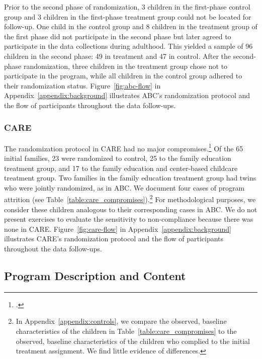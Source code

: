 \noindent Prior to the second phase of randomization, 3 children in the first-phase control group and 3 children in the first-phase treatment group could not be located for follow-up. One child in the control group and 8 children in the treatment group of the first phase did not participate in the second phase but later agreed to participate in the data collections during adulthood. This yielded a sample of 96 children in the second phase: 49 in treatment and 47 in control. After the second-phase randomization, three children in the treatment group chose not to participate in the program, while all children in the control group adhered to their randomization status. Figure~\ref{fig:abc-flow} in Appendix~\ref{appendix:background} illustrates ABC's randomization protocol and the flow of participants throughout the data follow-ups.\\

\subsubsection{CARE}

\noindent The randomization protocol in CARE had no major compromises.\footnote{\citet{Wasik_Ramey_etal_1990_CD,Burchinal_Campbell_etal_1997_CD}.} Of the 65 initial families, 23 were randomized to control, 25 to the family education treatment group, and 17 to the family education and center-based childcare treatment group. Two families in the family education treatment group had twins who were jointly randomized, as in ABC. We document four cases of program attrition (see Table~\ref{table:care_compromises}).\footnote{In Appendix~\ref{appendix:controls}, we compare the observed, baseline characteristics of the children in Table~\ref{table:care_compromises} to the observed, baseline characteristics of the children who complied to the initial treatment assignment. We find little evidence of differences.} For methodological purposes, we consider these children analogous to their corresponding cases in ABC. We do not present exercises to evaluate the sensitivity to non-compliance because there was none in CARE. Figure~\ref{fig:care-flow} in Appendix~\ref{appendix:background} illustrates CARE's randomization protocol and the flow of participants throughout the data follow-ups.\\



\subsection{Program Description and Content}

